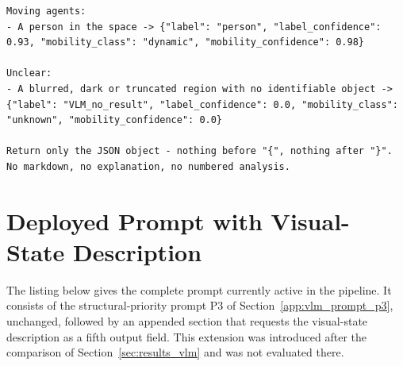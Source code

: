 \begin{lstlisting}[style=promptstyle]
Moving agents:
- A person in the space -> {"label": "person", "label_confidence": 0.93, "mobility_class": "dynamic", "mobility_confidence": 0.98}

Unclear:
- A blurred, dark or truncated region with no identifiable object -> {"label": "VLM_no_result", "label_confidence": 0.0, "mobility_class": "unknown", "mobility_confidence": 0.0}

Return only the JSON object - nothing before "{", nothing after "}". No markdown, no explanation, no numbered analysis.
\end{lstlisting}

\section{Deployed Prompt with Visual-State Description}
\label{app:vlm_prompt_deployed}

{\small The listing below gives the complete prompt currently active in the pipeline. It consists of the structural-priority prompt P3 of Section~\ref{app:vlm_prompt_p3}, unchanged, followed by an appended section that requests the visual-state description as a fifth output field. This extension was introduced after the comparison of Section~\ref{sec:results_vlm} and was not evaluated there.\par}

